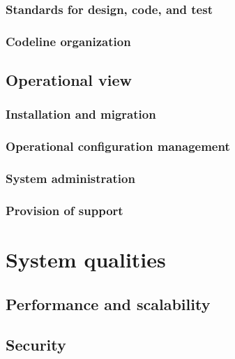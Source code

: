 \documentclass[a4paper,11pt]{report}
\begin{document}
\subsection{Standards for design, code, and test}
\label{sec:stand-design-code}


\subsection{Codeline organization}
\label{sec:codel-organ}


\section{Operational view}
\label{sec:operational-view}

\subsection{Installation and migration}
\label{sec:inst-migr}


\subsection{Operational configuration management}
\label{sec:oper-conf-manag}


\subsection{System administration}
\label{sec:syst-admin}


\subsection{Provision of support}
\label{sec:provision-support}


\chapter{System qualities}
\label{cha:system-qualities}
\thispagestyle{fancy}


\section{Performance and scalability}
\label{sec:perf-scal}


\section{Security}
\label{sec:security}
\end{document}
